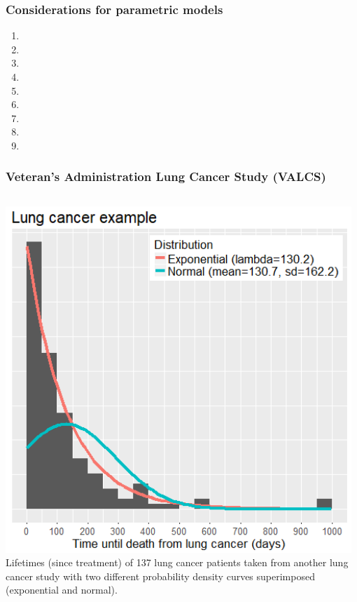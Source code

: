 \begin{frame}
\frametitle{Considerations for parametric models}
\begin{enumerate}
\item %
\item[]
\item[]
\item %
\item[]
\item[]
\item %
\item[]
\item[]
\end{enumerate}
\end{frame}

\begin{frame}
\frametitle{Veteran's Administration Lung Cancer Study (VALCS)}
\begin{columns}
\includegraphics[width=0.98\textwidth]{Figures/veteran_parametric_densities.png}
Lifetimes (since treatment) of 137 lung cancer patients taken from another lung cancer study with two different probability
density curves superimposed (exponential and normal).
\end{columns}
\end{frame}

